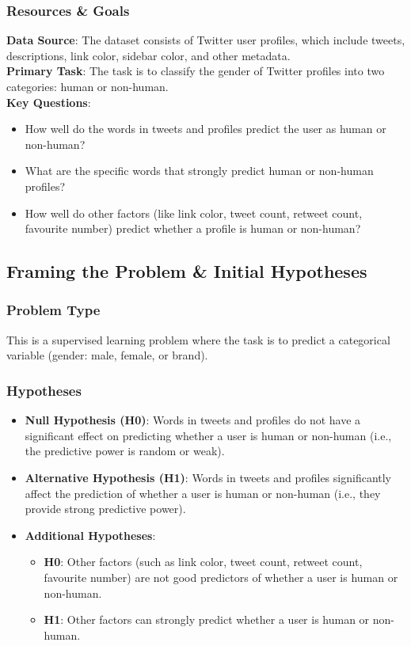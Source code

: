 \documentclass[a4paper,11pt]{article}
\begin{document}
\subsubsection*{Resources \& Goals}
\textbf{Data Source}: The dataset consists of Twitter user profiles, which include tweets, descriptions, link color, sidebar color, and other metadata. \\
\textbf{Primary Task}: The task is to classify the gender of Twitter profiles into two categories: human or non-human. \\
\textbf{Key Questions}:
\begin{itemize}
    \item How well do the words in tweets and profiles predict the user as human or non-human?
    \item What are the specific words that strongly predict human or non-human profiles?
    \item How well do other factors (like link color, tweet count, retweet count, favourite number) predict whether a profile is human or non-human?
\end{itemize}

\subsection{Framing the Problem \& Initial Hypotheses}
\subsubsection*{Problem Type}
This is a supervised learning problem where the task is to predict a categorical variable (gender: male, female, or brand).

\subsubsection*{Hypotheses}
\begin{itemize}
    \item \textbf{Null Hypothesis (H0)}: Words in tweets and profiles do not have a significant effect on predicting whether a user is human or non-human (i.e., the predictive power is random or weak).
    \item \textbf{Alternative Hypothesis (H1)}: Words in tweets and profiles significantly affect the prediction of whether a user is human or non-human (i.e., they provide strong predictive power).
    \item \textbf{Additional Hypotheses}:
    \begin{itemize}
        \item \textbf{H0}: Other factors (such as link color, tweet count, retweet count, favourite number) are not good predictors of whether a user is human or non-human.
        \item \textbf{H1}: Other factors can strongly predict whether a user is human or non-human.
    \end{itemize}
\end{itemize}
\end{document}
